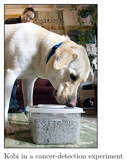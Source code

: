 \documentclass{beamer}
\begin{document}
\begin{frame}
\begin{columns}
\begin{center}
\includegraphics[width=.9\linewidth]{images/dog.jpg} \\
{\tiny Kobi in a cancer-detection experiment}
\end{center}
\end{columns}
\end{frame}
\end{document}

